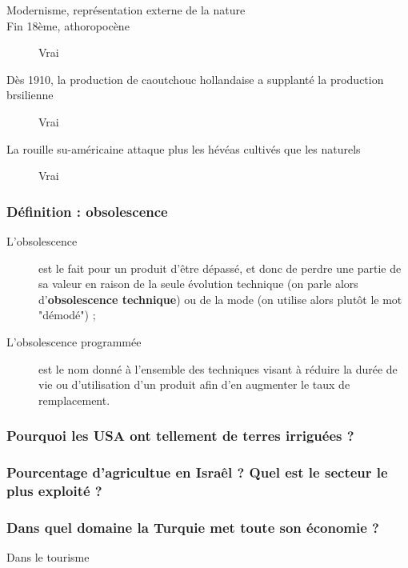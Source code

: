 \begin{description}
	\item [Modernisme, représentation externe de la nature]
    \color{cyan}\color{black}
    
	\item [Fin 18ème, athoropocène]
    \color{cyan}Vrai\color{black}
    
	\item [Dès 1910, la production de caoutchouc hollandaise a supplanté la production brsilienne]
    \color{cyan}Vrai\color{black}
    
	\item [La rouille su-américaine attaque plus les hévéas cultivés que les naturels]
    \color{cyan}Vrai\color{black}
\end{description}

\subsubsection{Définition : obsolescence}
\color{cyan}
\begin{description}
	\item [L'obsolescence] est le fait pour un produit d’être dépassé, et donc de perdre une partie de sa valeur en raison de la seule évolution technique (on parle alors d'\textbf{obsolescence technique}) ou de la mode (on utilise alors plutôt le mot "démodé") ;
	\item [L’obsolescence programmée] est le nom donné à l'ensemble des techniques visant à réduire la durée de vie ou d'utilisation d'un produit afin d'en augmenter le taux de remplacement.\color{black}
\end{description}
\color{black}

\subsubsection{Pourquoi les USA ont tellement de terres irriguées ?}
\color{cyan}
\color{black}

\subsubsection{Pourcentage d'agricultue en Israêl ? Quel est le secteur le plus exploité ?}
\color{cyan}
\color{black}

\subsubsection{Dans quel domaine la Turquie met toute son économie ?}
\color{cyan}
Dans le tourisme
\color{black}

